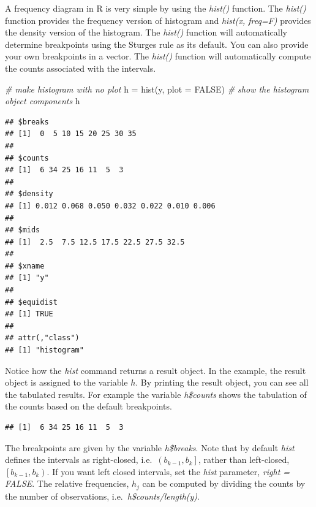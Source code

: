 \documentclass[
]{book}
\newenvironment{Shaded}{\begin{snugshade}}{\end{snugshade}}
\newcommand{\AttributeTok}[1]{\textcolor[rgb]{0.77,0.63,0.00}{#1}}
\newcommand{\CommentTok}[1]{\textcolor[rgb]{0.56,0.35,0.01}{\textit{#1}}}
\newcommand{\ConstantTok}[1]{\textcolor[rgb]{0.00,0.00,0.00}{#1}}
\newcommand{\FunctionTok}[1]{\textcolor[rgb]{0.00,0.00,0.00}{#1}}
\newcommand{\NormalTok}[1]{#1}
\newcommand{\OtherTok}[1]{\textcolor[rgb]{0.56,0.35,0.01}{#1}}
\newcommand{\SpecialCharTok}[1]{\textcolor[rgb]{0.00,0.00,0.00}{#1}}
\theoremstyle{definition}
\theoremstyle{definition}
\theoremstyle{definition}
\theoremstyle{definition}
\theoremstyle{remark}
\begin{document}
A frequency diagram in R is very simple by using the \emph{hist()} function.
The \emph{hist()} function provides the frequency version of histogram and
\emph{hist(x, freq=F)} provides the density version of the histogram. The
\emph{hist()} function will automatically determine breakpoints using the
Sturges rule as its default. You can also provide your own breakpoints
in a vector. The \emph{hist()} function will automatically compute the counts
associated with the intervals.

\begin{Shaded}
\begin{Highlighting}[]
\CommentTok{\# make histogram with no plot}
\NormalTok{h }\OtherTok{=} \FunctionTok{hist}\NormalTok{(y, }\AttributeTok{plot =} \ConstantTok{FALSE}\NormalTok{)}
\CommentTok{\# show the histogram object components}
\NormalTok{h}
\end{Highlighting}
\end{Shaded}

\begin{verbatim}
## $breaks
## [1]  0  5 10 15 20 25 30 35
## 
## $counts
## [1]  6 34 25 16 11  5  3
## 
## $density
## [1] 0.012 0.068 0.050 0.032 0.022 0.010 0.006
## 
## $mids
## [1]  2.5  7.5 12.5 17.5 22.5 27.5 32.5
## 
## $xname
## [1] "y"
## 
## $equidist
## [1] TRUE
## 
## attr(,"class")
## [1] "histogram"
\end{verbatim}

Notice how the \emph{hist} command returns a result object. In the example,
the result object is assigned to the variable \(h\). By printing the
result object, you can see all the tabulated results. For example the
variable \emph{h\$counts} shows the tabulation of the counts based on the
default breakpoints.

\begin{Shaded}
\end{Shaded}

\begin{verbatim}
## [1]  6 34 25 16 11  5  3
\end{verbatim}

The breakpoints are given by the variable
\emph{h\$breaks}. Note that by default \emph{hist} defines the intervals as
right-closed, i.e.~\(\left(b_{k-1}, b_{k} \right]\), rather than
left-closed, \(\left[b_{k-1}, b_{k} \right)\). If you want left closed
intervals, set the \emph{hist} parameter, \emph{right = FALSE}. The relative
frequencies, \(h_j\) can be computed by dividing the counts by the number
of observations, i.e.~\emph{h\$counts/length(y)}.
\end{document}
